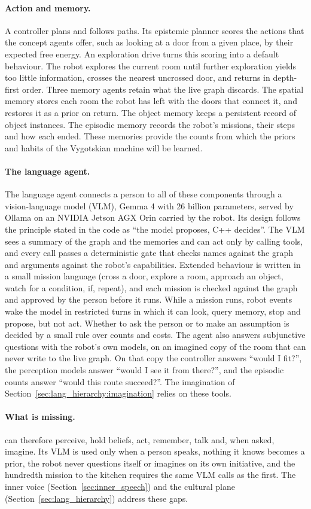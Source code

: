 \paragraph{Action and memory.}
A controller plans and follows paths. Its epistemic planner scores the actions that the concept agents offer, such as
looking at a door from a given place, by their expected free energy. An exploration drive turns this scoring into a
default behaviour. The robot explores the current room until further exploration yields too little information,
crosses the nearest uncrossed door, and returns in depth-first order. Three memory agents retain what the live graph
discards. The spatial memory stores each room the robot has left with the doors that connect it, and restores it as a
prior on return. The object memory keeps a persistent record of object instances. The episodic memory records the
robot's missions, their steps and how each ended. These memories provide the counts from which the priors and habits
of the Vygotskian machine will be learned.

\paragraph{The language agent.}
The language agent connects a person to all of these components through a vision-language model (VLM), Gemma 4
with 26 billion parameters, served by Ollama on an NVIDIA Jetson AGX Orin carried by the robot. Its design follows the principle
stated in the code as ``the model proposes, C++ decides''. The VLM sees a summary of the graph and the memories and can
act only by calling tools, and every call passes a deterministic gate that checks names against the graph and
arguments against the robot's capabilities. Extended behaviour is written in a small mission language (cross a door,
explore a room, approach an object, watch for a condition, if, repeat), and each mission is checked against the graph
and approved by the person before it runs. While a mission runs, robot events wake the model in restricted turns in
which it can look, query memory, stop and propose, but not act. Whether to ask the person or to make an assumption is
decided by a small rule over counts and costs. The agent also answers subjunctive questions with the robot's own
models, on an imagined copy of the room that can never write to the live graph. On that copy the controller answers
``would I fit?'', the perception models answer ``would I see it from there?'', and the episodic counts answer ``would
this route succeed?''. The imagination of Section~\ref{sec:lang_hierarchy:imagination} relies on these tools.

\paragraph{What is missing.}
\cortex{} can therefore perceive, hold beliefs, act, remember, talk and, when asked, imagine. Its VLM is used only when a
person speaks, nothing it knows becomes a prior, the robot never questions itself or imagines on its own initiative,
and the hundredth mission to the kitchen requires the same VLM calls as the first. The inner voice
(Section~\ref{sec:inner_speech}) and the cultural plane (Section~\ref{sec:lang_hierarchy}) address these gaps.

